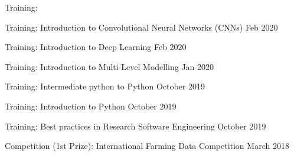 
Training: 

Training: Introduction to Convolutional Neural Networks (CNNs) \hfill Feb 2020

Training: Introduction to Deep Learning \hfill Feb 2020


Training: Introduction to Multi-Level Modelling \hfill Jan 2020

Training: Intermediate python to Python \hfill October 2019

Training: Introduction to Python \hfill October 2019

Training: Best practices in Research Software Engineering \hfill October 2019

Competition (1st Prize): International Farming Data Competition \hfill March 2018

